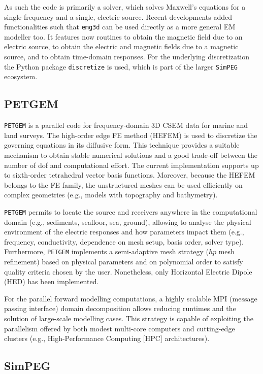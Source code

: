 \documentclass[onecolumn,extra,camera]{gji}
\newcommand{\emg}[2]{\texttt{emg#1#2}\xspace}
\newcommand{\simpeg}{\texttt{SimPEG}\xspace}
\newcommand{\discretize}{\texttt{discretize}\xspace}
\newcommand{\petgem}{\texttt{PETGEM}\xspace}
\begin{document}
As such the code is primarily a solver, which solves Maxwell's equations for a single frequency and a single, electric source. Recent developments added functionalities such that \emg3d can be used directly as a more general EM modeller too. It features now routines to obtain the magnetic field due to an electric source, to obtain the electric and magnetic fields due to a magnetic source, and to obtain time-domain responses. For the underlying discretization the Python package \discretize is used, which is part of the larger \simpeg ecosystem.

\subsection{PETGEM}

\petgem is a parallel code for frequency-domain 3D CSEM data for marine and land surveys. The high-order edge FE method (HEFEM) is used to discretize the governing equations in its diffusive form. This technique provides a suitable mechanism to obtain stable numerical solutions and a good trade-off between the number of dof and computational effort. The current implementation supports up to sixth-order tetrahedral vector basis functions. Moreover, because the HEFEM belongs to the FE family, the unstructured meshes can be used efficiently on complex geometries (e.g., models with topography and bathymetry).

\petgem permits to locate the source and receivers anywhere in the computational domain (e.g., sediments, seafloor, sea, ground), allowing to analyse the physical environment of the electric responses and how parameters impact them (e.g., frequency, conductivity, dependence on mesh setup, basis order, solver type). Furthermore, \petgem implements a semi-adaptive mesh strategy ($hp$ mesh refinement) based on physical parameters and on polynomial order to satisfy quality criteria chosen by the user. Nonetheless, only Horizontal Electric Dipole (HED) has been implemented.

For the parallel forward modelling computations, a highly scalable MPI (message passing interface) domain decomposition allows reducing runtimes and the solution of large-scale modelling cases. This strategy is capable of exploiting the parallelism offered by both modest multi-core computers and cutting-edge clusters (e.g., High-Performance Computing [HPC] architectures).

\subsection{SimPEG}
\end{document}
